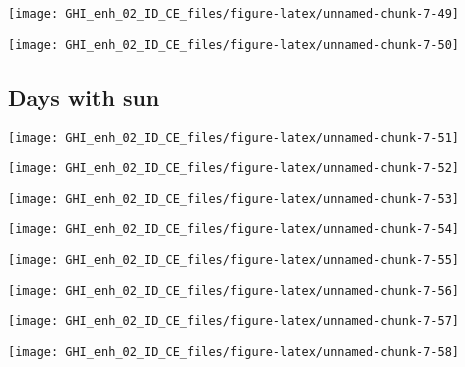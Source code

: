 \documentclass[
  10pt,
  a4paper,oneside]{article}
\begin{document}
\begin{center}\texttt{[image: GHI\_enh\_02\_ID\_CE\_files/figure-latex/unnamed-chunk-7-49]} \end{center}

\begin{center}\texttt{[image: GHI\_enh\_02\_ID\_CE\_files/figure-latex/unnamed-chunk-7-50]} \end{center}

\hypertarget{days-with-sun}{%
\subsection{Days with sun}\label{days-with-sun}}

\begin{center}\texttt{[image: GHI\_enh\_02\_ID\_CE\_files/figure-latex/unnamed-chunk-7-51]} \end{center}

\begin{center}\texttt{[image: GHI\_enh\_02\_ID\_CE\_files/figure-latex/unnamed-chunk-7-52]} \end{center}

\begin{center}\texttt{[image: GHI\_enh\_02\_ID\_CE\_files/figure-latex/unnamed-chunk-7-53]} \end{center}

\begin{center}\texttt{[image: GHI\_enh\_02\_ID\_CE\_files/figure-latex/unnamed-chunk-7-54]} \end{center}

\begin{center}\texttt{[image: GHI\_enh\_02\_ID\_CE\_files/figure-latex/unnamed-chunk-7-55]} \end{center}

\begin{center}\texttt{[image: GHI\_enh\_02\_ID\_CE\_files/figure-latex/unnamed-chunk-7-56]} \end{center}

\begin{center}\texttt{[image: GHI\_enh\_02\_ID\_CE\_files/figure-latex/unnamed-chunk-7-57]} \end{center}

\begin{center}\texttt{[image: GHI\_enh\_02\_ID\_CE\_files/figure-latex/unnamed-chunk-7-58]} \end{center}
\end{document}
